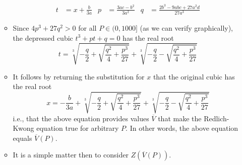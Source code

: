 \documentclass[../notes.tex]{subfiles}
\begin{document}
\begin{itemize}
\begin{itemize}
        \begin{align*}
            t &= x+\frac{b}{3a}&
            p &= \frac{3ac-b^2}{3a^2}&
            q &= \frac{2b^3-9abc+27a^2d}{27a^3}
        \end{align*}
        \item Since $4p^3+27q^2>0$ for all $P\in(0,1000]$ (as we can verify graphically), the depressed cubic $t^3+pt+q=0$ has the real root
        \begin{equation*}
            t = \sqrt[3]{-\frac{q}{2}+\sqrt{\frac{q^2}{4}+\frac{p^3}{27}}}+\sqrt[3]{-\frac{q}{2}-\sqrt{\frac{q^2}{4}+\frac{p^3}{27}}}
        \end{equation*}
        \item It follows by returning the substitution for $x$ that the original cubic has the real root
        \begin{equation*}
            x = -\frac{b}{3a}+\sqrt[3]{-\frac{q}{2}+\sqrt{\frac{q^2}{4}+\frac{p^3}{27}}}+\sqrt[3]{-\frac{q}{2}-\sqrt{\frac{q^2}{4}+\frac{p^3}{27}}}
        \end{equation*}
        i.e., that the above equation provides values $\overline{V}$ that make the Redlich-Kwong equation true for arbitrary $P$. In other words, the above equation equals $\overline{V}(P)$.
        \item It is a simple matter then to consider $Z(\overline{V}(P))$.
    \end{itemize}
\end{itemize}
\end{document}
